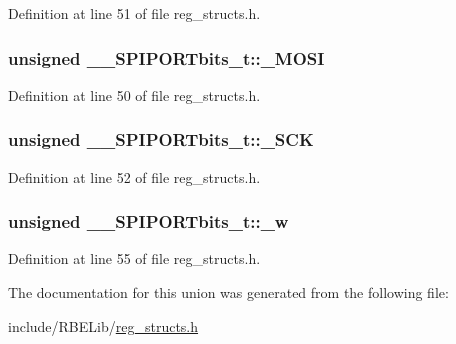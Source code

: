 Definition at line 51 of file reg\-\_\-structs.\-h.

\hypertarget{union_____s_p_i_p_o_r_tbits__t_aad271e40e94776c0c0b4c69573527867}{
\subsubsection[{\-\_\-\-M\-O\-S\-I}]{\setlength{\rightskip}{0pt plus 5cm}unsigned \-\_\-\-\_\-\-S\-P\-I\-P\-O\-R\-Tbits\-\_\-t\-::\-\_\-\-M\-O\-S\-I}}\label{union_____s_p_i_p_o_r_tbits__t_aad271e40e94776c0c0b4c69573527867}


Definition at line 50 of file reg\-\_\-structs.\-h.

\hypertarget{union_____s_p_i_p_o_r_tbits__t_af5db81645a0530bcbb7321f2e5664209}{
\subsubsection[{\-\_\-\-S\-C\-K}]{\setlength{\rightskip}{0pt plus 5cm}unsigned \-\_\-\-\_\-\-S\-P\-I\-P\-O\-R\-Tbits\-\_\-t\-::\-\_\-\-S\-C\-K}}\label{union_____s_p_i_p_o_r_tbits__t_af5db81645a0530bcbb7321f2e5664209}


Definition at line 52 of file reg\-\_\-structs.\-h.

\hypertarget{union_____s_p_i_p_o_r_tbits__t_abb3fb2027795720ba0463bb2859499dc}{
\subsubsection[{\-\_\-w}]{\setlength{\rightskip}{0pt plus 5cm}unsigned \-\_\-\-\_\-\-S\-P\-I\-P\-O\-R\-Tbits\-\_\-t\-::\-\_\-w}}\label{union_____s_p_i_p_o_r_tbits__t_abb3fb2027795720ba0463bb2859499dc}


Definition at line 55 of file reg\-\_\-structs.\-h.



The documentation for this union was generated from the following file\-:\begin{DoxyCompactItemize}
\item 
include/\-R\-B\-E\-Lib/\hyperlink{reg__structs_8h}{reg\-\_\-structs.\-h}\end{DoxyCompactItemize}
